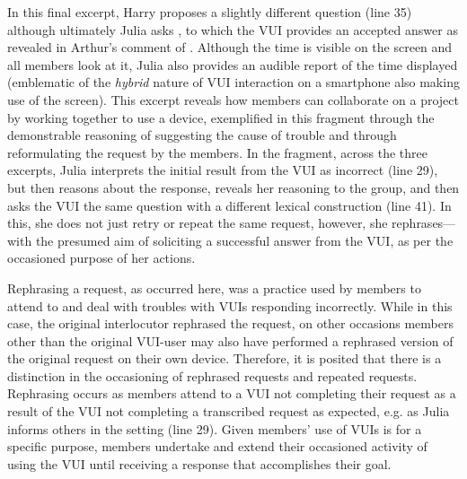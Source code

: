 \begin{revisedsubmission}
In this final excerpt, Harry proposes a slightly different question (line 35) although ultimately Julia asks , to which the \ac{VUI} provides an accepted answer as revealed in Arthur's comment of .
Although the time is visible on the screen and all members look at it, Julia also provides an audible report of the time displayed (emblematic of the \textit{hybrid} nature of \ac{VUI} interaction on a smartphone also making use of the screen).
This excerpt reveals how members can collaborate on a project by working together to use a device, exemplified in this fragment through the demonstrable reasoning of suggesting the cause of trouble and through reformulating the request by the members.
In the fragment, across the three excerpts, Julia interprets the initial result from the \ac{VUI} as incorrect (line 29), but then reasons about the response, reveals her reasoning to the group, and then asks the \ac{VUI} the same question with a different lexical construction (line 41).
In this, she does not just retry or repeat the same request, however, she rephrases---with the presumed aim of soliciting a successful answer from the \ac{VUI}, as per the occasioned purpose of her actions.

Rephrasing a request, as occurred here, was a practice used by members to attend to and deal with troubles with \acp{VUI} responding incorrectly.
While in this case, the original interlocutor rephrased the request, on other occasions members other than the original \ac{VUI}-user may also have performed a rephrased version of the original request on their own device.
Therefore, it is posited that there is a distinction in the occasioning of rephrased requests and repeated requests.
Rephrasing occurs as members attend to a \ac{VUI} not completing their request as a result of the \ac{VUI} not completing a transcribed request as expected, e.g. as Julia informs others in the setting (line 29).
Given members' use of \acp{VUI} is for a specific purpose, members undertake and extend their occasioned activity of using the \ac{VUI} until receiving a response that accomplishes their goal.%


\end{revisedsubmission}

